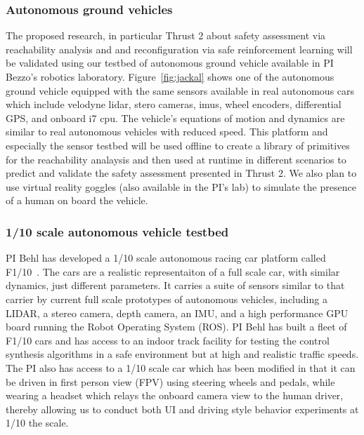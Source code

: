 \subsubsection{Autonomous ground vehicles}
The proposed research, in particular Thrust 2 about safety assessment via reachability analysis and and reconfiguration via safe reinforcement learning will be validated using our testbed of autonomous ground vehicle available in PI Bezzo's robotics laboratory. Figure~\ref{fig:jackal} shows one of the autonomous ground vehicle equipped with the same sensors available in real autonomous cars which include velodyne lidar, stero cameras, imus, wheel encoders, differential GPS, and onboard i7 cpu. The vehicle's equations of motion and dynamics are similar to real autonomous vehicles with reduced speed. This platform and especially the sensor testbed will be used offline to create a library of primitives for the reachability analaysis and then used at runtime in different scenarios to predict and validate the safety assessment presented in Thrust 2. We also plan to use virtual reality goggles (also available in the PI's lab) to simulate the presence of a human on board the vehicle. 

\subsubsection{1/10 scale autonomous vehicle testbed}

PI Behl has developed a 1/10 scale autonomous racing car platform called F1/10~. The cars are a realistic representaiton of a full scale car, with similar dynamics, just different parameters. It carries a suite of sensors similar to that carrier by current full scale prototypes of autonomous vehicles, including a LIDAR, a stereo camera, depth camera, an IMU, and a high performance GPU board running the Robot Operating System (ROS).
PI Behl has built a fleet of F1/10 cars and has access to an indoor track facility for testing the control synthesis algorithms in a safe environment but at high and realistic traffic speeds. The PI also has access to a 1/10 scale car which has been modified in that it can be driven in first person view (FPV) using steering wheels and pedals, while wearing a headset which relays the onboard camera view to the human driver, thereby allowing us to conduct both UI and driving style behavior experiments at 1/10 the scale.



